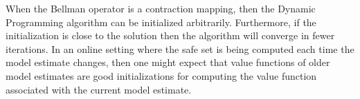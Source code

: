 \documentclass[letterpaper, 10 pt, conference]{ieeeconf}
\begin{document}
%

When the Bellman operator is a contraction mapping, then the Dynamic Programming algorithm can be initialized arbitrarily. Furthermore, if the initialization is close to the solution then the algorithm will converge in fewer iterations. In an online setting where the safe set is being computed each time the model estimate changes, then one might expect that value functions of older model estimates are good initializations for computing the value function associated with the current model estimate. 
\end{document}
